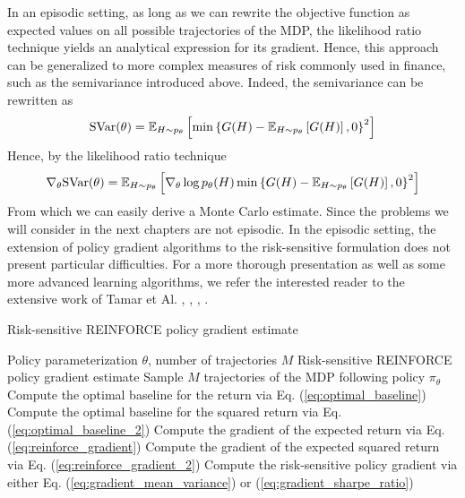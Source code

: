 In an episodic setting, as long as we can rewrite the objective function as expected values on all possible trajectories of the MDP, the likelihood ratio technique yields an analytical expression for its gradient. Hence, this approach can be generalized to more complex measures of risk commonly used in finance, such as the semivariance introduced above. Indeed, the semivariance can be rewritten as 
\begin{equation}
	\text{SVar}(\theta) = \E[H \sim p_\theta]{\min\left\{G(H) - \E[H \sim p_\theta]{G(H)}, 0\right\}^2}
\end{equation}
Hence, by the likelihood ratio technique
\begin{equation}
	\nabla_\theta \text{SVar}(\theta) = \E[H \sim p_\theta]{\nabla_\theta \log p_\theta(H) \min\left\{G(H) - \E[H \sim p_\theta]{G(H)}, 0\right\}^2}
\end{equation}
From which we can easily derive a Monte Carlo estimate. Since the problems we will consider in the next chapters are not episodic. In the episodic setting, the extension of policy gradient algorithms to the risk-sensitive formulation does not present particular difficulties. For a more thorough presentation as well as some more advanced learning algorithms, we refer the interested reader to the extensive work of Tamar et Al.  \cite{tamar2013temporal}, \cite{tamar2013variance}, \cite{tamar2015policy}, \cite{chow2015risk}.
\begin{algorithm}[t]
	\caption{Risk-sensitive REINFORCE policy gradient estimate}
	\label{algo:RSreinforce}
	\begin{algorithmic}[1]
		\Require Policy parameterization $\theta$, number of trajectories $M$
		\Ensure Risk-sensitive REINFORCE policy gradient estimate
		\State Sample $M$ trajectories of the MDP following policy $\pi_\theta$
		\State Compute the optimal baseline for the return via Eq. (\ref{eq:optimal_baseline})
		\State Compute the optimal baseline for the squared return via Eq. (\ref{eq:optimal_baseline_2})
		\State Compute the gradient of the expected return via Eq. (\ref{eq:reinforce_gradient})
		\State Compute the gradient of the expected squared return via Eq. (\ref{eq:reinforce_gradient_2})
		\State Compute the risk-sensitive policy gradient via either Eq. (\ref{eq:gradient_mean_variance}) or (\ref{eq:gradient_sharpe_ratio})
	\end{algorithmic}
\end{algorithm}

